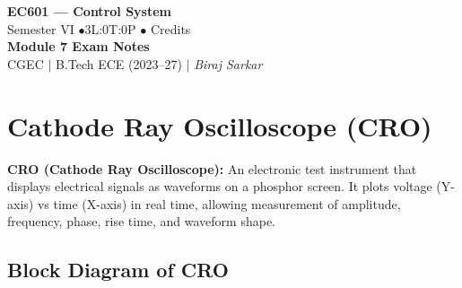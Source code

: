 \documentclass[12pt,a4paper]{article}
\begin{document}
\begin{center}
  {\LARGE\bfseries\color{myred} EC601 --- Control System}\\[5pt]
  {\normalsize\color{mydark} Semester VI \quad$\bullet$\quad 3L:0T:0P \quad$\bullet$ Credits}\\[3pt]
  {\normalsize\color{myteal}\textbf{Module 7 Exam Notes}}\\[3pt]
  {\small\color{mydark} CGEC \;$|$\; B.Tech ECE (2023--27) \;$|$\; \textit{Biraj Sarkar}}
\end{center}
\vspace{2pt}\noindent{\color{myred}\rule{\linewidth}{1.5pt}}\vspace{2pt}
\hypersetup{linkcolor=mydark}
\tableofcontents
\hypersetup{linkcolor=myteal}\newpage

\section{Cathode Ray Oscilloscope (CRO)}

\begin{tcolorbox}[defbox]
\textbf{CRO (Cathode Ray Oscilloscope):} An electronic test instrument that displays electrical signals as waveforms on a phosphor screen. It plots voltage (Y-axis) vs time (X-axis) in real time, allowing measurement of amplitude, frequency, phase, rise time, and waveform shape.
\end{tcolorbox}

\subsection{Block Diagram of CRO}
\end{document}
